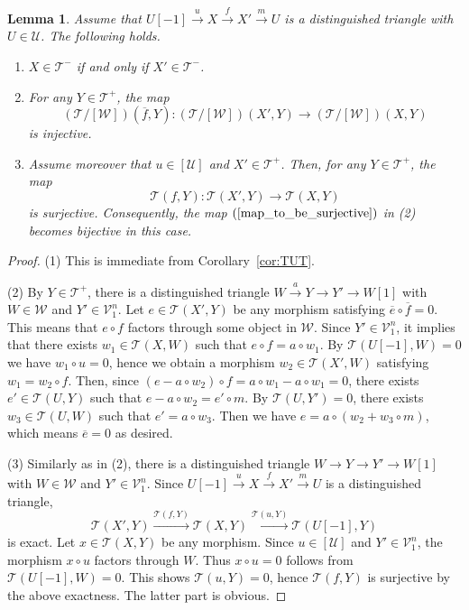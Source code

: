 \documentclass[a4paper,reqno,10pt]{amsart}
\DeclareRobustCommand{\darkblueedit}[1]{#1}
\newtheorem{lemma}[lemma]{Lemma}
\theoremstyle{definition}
\theoremstyle{definition}
\theoremstyle{definition}
\theoremstyle{definition}
\theoremstyle{plain}
\newcommand{\CT}{\mathcal{T}}
\newcommand{\CU}{\mathcal{U}}
\newcommand{\CV}{\mathcal{V}}
\newcommand{\CW}{\mathcal{W}}
\begin{document}
\begin{lemma}\label{lem:T-toT-}
Assume that $U[-1]\xrightarrow{u}X\xrightarrow{f}X'\xrightarrow{m}U$ is a distinguished triangle with $U\in\CU$. The following holds.
\begin{enumerate}
\item %
$X\in\CT^-$ if and only if $X'\in\CT^-$.
\normalcolor
\item For any $Y\in\CT^+$, the map
\begin{equation}\label{map_to_be_surjective}
(\CT/[\CW])(\overline{f},Y)\colon(\CT/[\CW])(X',Y)\to(\CT/[\CW])(X,Y)
\end{equation}
is injective.
\item Assume moreover that $u\in[\CU]$ and $X'\in\CT^+$. Then, for any $Y\in\CT^+$, the map
\[
\CT(f,Y)\colon\CT(X',Y)\to\CT(X,Y)
\]
is surjective. Consequently, the map $(\ref{map_to_be_surjective})$ in {\rm (2)} becomes bijective in this case.
\end{enumerate}
\end{lemma}
\begin{proof}
{\rm (1)} This is immediate from Corollary~\ref{cor:TUT}.
\normalcolor

{\rm (2)} By $Y\in\CT^+$, there is a distinguished triangle $W\xrightarrow{a}Y\to Y'\to W[1]$ with $W\in\CW$ and $Y'\in\CV_1^n$. 
Let $e\in\CT(X',Y)$ be any morphism satisfying $\overline{e}\circ\overline{f}=0$. This means that $e\circ f$ factors through some object in $\CW$. Since $Y'\in\CV_1^n$, it implies that there exists $w_1\in\CT(X,W)$ such that $e\circ f=a\circ w_1$. By $\CT(U[-1],W)=0$ we have $w_1\circ u=0$, hence we obtain a morphism $w_2\in\CT(X',W)$ satisfying $w_1=w_2\circ f$. Then, since $(e-a\circ w_2)\circ f=a\circ w_1-a\circ w_1=0$, there exists $e'\in\CT(U,Y)$ such that $e-a\circ w_2=e'\circ m$. By $\CT(U,Y')=0$, there exists $w_3\in\CT(U,W)$ such that $e'=a\circ w_3$. Then we have $e=a\circ(w_2+w_3\circ m)$, which means $\overline{e}=0$ as desired.

{\rm (3)} Similarly as in {\rm (2)}, there is a distinguished triangle $W\to Y\to Y'\to W[1]$ with $W\in\CW$ and $Y'\in\CV_1^n$. Since $U[-1]\xrightarrow{u}X\xrightarrow{f}X'\xrightarrow{m}U$ is a distinguished triangle, 
\[
\CT(X',Y)\xrightarrow{\CT(f,Y)}\CT(X,Y)\xrightarrow{\CT(u,Y)}\CT(U[-1],Y)
\]
is exact.
Let $x\in\CT(X,Y)$ be any morphism.
Since $u\in [\CU]$ and $Y'\in\CV_1^n$, \darkblueedit{the morphism} $x\circ u$ factors through $W$. Thus $x\circ u=0$ follows from $\CT(U[-1],W)=0$. This shows $\CT(u,Y)=0$, hence $\CT(f,Y)$ is surjective by the above exactness. The latter part is obvious.
\end{proof}
\end{document}
